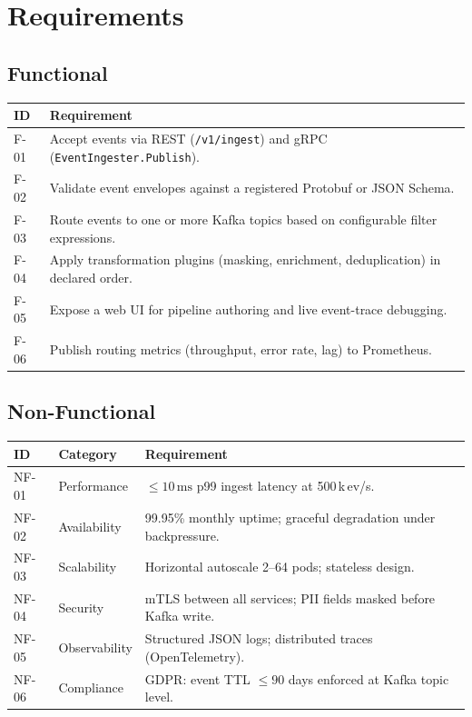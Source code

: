 \section{Requirements}

\subsection{Functional}

\begin{tabularx}{\linewidth}{@{}lX@{}}
  \toprule
  \textbf{ID} & \textbf{Requirement} \\
  \midrule
  F-01 & Accept events via REST (\texttt{/v1/ingest}) and gRPC (\texttt{EventIngester.Publish}). \\[2pt]
  F-02 & Validate event envelopes against a registered Protobuf or JSON Schema. \\[2pt]
  F-03 & Route events to one or more Kafka topics based on configurable filter expressions. \\[2pt]
  F-04 & Apply transformation plugins (masking, enrichment, deduplication) in declared order. \\[2pt]
  F-05 & Expose a web UI for pipeline authoring and live event-trace debugging. \\[2pt]
  F-06 & Publish routing metrics (throughput, error rate, lag) to Prometheus. \\
  \bottomrule
\end{tabularx}

\subsection{Non-Functional}

\begin{tabularx}{\linewidth}{@{}llX@{}}
  \toprule
  \textbf{ID} & \textbf{Category} & \textbf{Requirement} \\
  \midrule
  NF-01 & Performance   & $\leq 10\,\mathrm{ms}$ p99 ingest latency at 500\,k\,ev/s. \\[2pt]
  NF-02 & Availability  & 99.95\% monthly uptime; graceful degradation under backpressure. \\[2pt]
  NF-03 & Scalability   & Horizontal autoscale 2--64 pods; stateless design. \\[2pt]
  NF-04 & Security      & mTLS between all services; PII fields masked before Kafka write. \\[2pt]
  NF-05 & Observability & Structured JSON logs; distributed traces (OpenTelemetry). \\[2pt]
  NF-06 & Compliance    & GDPR: event TTL $\leq 90$ days enforced at Kafka topic level. \\
  \bottomrule
\end{tabularx}

